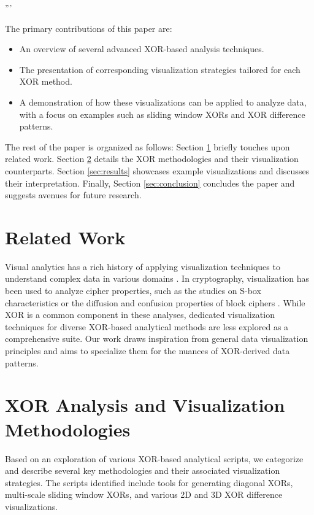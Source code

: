 '''\documentclass[conference]{IEEEtran}
\begin{document}
The primary contributions of this paper are:
\begin{itemize}
    \item An overview of several advanced XOR-based analysis techniques.
    \item The presentation of corresponding visualization strategies tailored for each XOR method.
    \item A demonstration of how these visualizations can be applied to analyze data, with a focus on examples such as sliding window XORs and XOR difference patterns.
\end{itemize}

The rest of the paper is organized as follows: Section \ref{sec:related_work} briefly touches upon related work. Section \ref{sec:xor_methods} details the XOR methodologies and their visualization counterparts. Section \ref{sec:results} showcases example visualizations and discusses their interpretation. Finally, Section \ref{sec:conclusion} concludes the paper and suggests avenues for future research.

\section{Related Work} \label{sec:related_work}
Visual analytics has a rich history of applying visualization techniques to understand complex data in various domains \cite{Keim2008}. In cryptography, visualization has been used to analyze cipher properties, such as the studies on S-box characteristics or the diffusion and confusion properties of block ciphers \cite{DaemenRijmen2002}. While XOR is a common component in these analyses, dedicated visualization techniques for diverse XOR-based analytical methods are less explored as a comprehensive suite. Our work draws inspiration from general data visualization principles and aims to specialize them for the nuances of XOR-derived data patterns.

\section{XOR Analysis and Visualization Methodologies} \label{sec:xor_methods}
Based on an exploration of various XOR-based analytical scripts, we categorize and describe several key methodologies and their associated visualization strategies. The scripts identified include tools for generating diagonal XORs, multi-scale sliding window XORs, and various 2D and 3D XOR difference visualizations.
\end{document}
